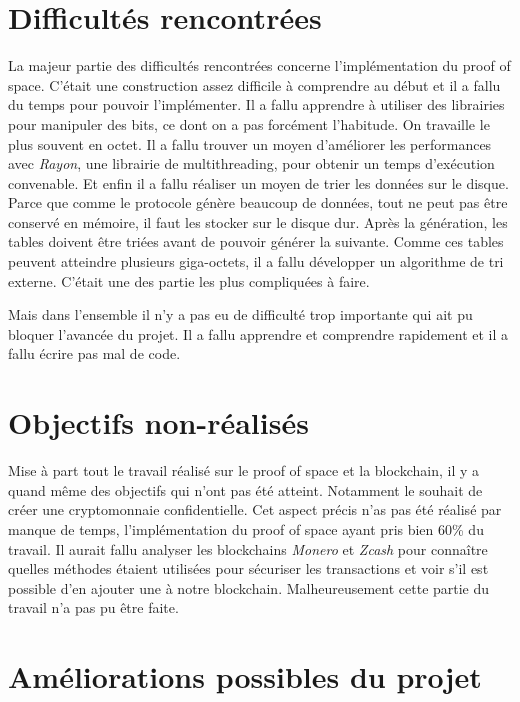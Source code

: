 \section{Difficultés rencontrées}

La majeur partie des difficultés rencontrées concerne l'implémentation du proof of space. C'était une construction assez difficile à comprendre au début et il a fallu du temps pour pouvoir l'implémenter. Il a fallu apprendre à utiliser des librairies pour manipuler des bits, ce dont on a pas forcément l'habitude. On travaille le plus souvent en octet. Il a fallu trouver un moyen d'améliorer les performances avec \emph{Rayon}, une librairie de multithreading, pour obtenir un temps d'exécution convenable. Et enfin il a fallu réaliser un moyen de trier les données sur le disque. Parce que comme le protocole génère beaucoup de données, tout ne peut pas être conservé en mémoire, il faut les stocker sur le disque dur. Après la génération, les tables doivent être triées avant de pouvoir générer la suivante. Comme ces tables peuvent atteindre plusieurs giga-octets, il a fallu développer un algorithme de tri externe. C'était une des partie les plus compliquées à faire.

Mais dans l'ensemble il n'y a pas eu de difficulté trop importante qui ait pu bloquer l'avancée du projet. Il a fallu apprendre et comprendre rapidement et il a fallu écrire pas mal de code.


\section{Objectifs non-réalisés}

Mise à part tout le travail réalisé sur le proof of space et la blockchain, il y a quand même des objectifs qui n'ont pas été atteint. Notamment le souhait de créer une cryptomonnaie confidentielle. Cet aspect précis n'as pas été réalisé par manque de temps, l'implémentation du proof of space ayant pris bien 60\% du travail. Il aurait fallu analyser les blockchains \emph{Monero} et \emph{Zcash} pour connaître quelles méthodes étaient utilisées pour sécuriser les transactions et voir s'il est possible d'en ajouter une à notre blockchain. Malheureusement cette partie du travail n'a pas pu être faite.

\newpage

\section{Améliorations possibles du projet}

